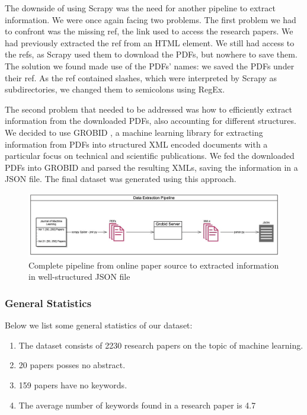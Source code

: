 The downside of using Scrapy was the need for another pipeline to extract information. We were once again facing two problems. The first problem we had to confront was the missing ref, the link used to access the research papers. We had previously extracted the ref from an HTML element. We still had access to the refs, as Scrapy used them to download the PDFs, but nowhere to save them. The solution we found made use of the PDFs' names: we saved the PDFs under their ref. As the ref contained slashes, which were interpreted by Scrapy as subdirectories, we changed them to semicolons using RegEx.


The second problem that needed to be addressed was how to efficiently extract information from the downloaded PDFs, also accounting for different structures. We decided to use GROBID \cite{GROBID}, a machine learning library for extracting information from PDFs into structured XML encoded documents with a particular focus on technical and scientific publications. We fed the downloaded PDFs into GROBID and parsed the resulting XMLs, saving the information in a JSON file. The final dataset was generated using this approach.


\begin{figure}[h]
    \centering
    \includegraphics[width=1.0\linewidth]{imgs/data_pipeline.png}
    \caption{Complete pipeline from online paper source to extracted information in well-structured JSON file}
    \label{fig:data pipeline}
\end{figure}

\subsubsection{General Statistics}
Below we list some general statistics of our dataset:
\begin{enumerate}
	\item The dataset consists of 2230 research papers on the topic of machine learning.
	\item 20 papers posses no abstract.
	\item 159 papers have no keywords.
	\item The average number of keywords found in a research paper is 4.7
\end{enumerate}
